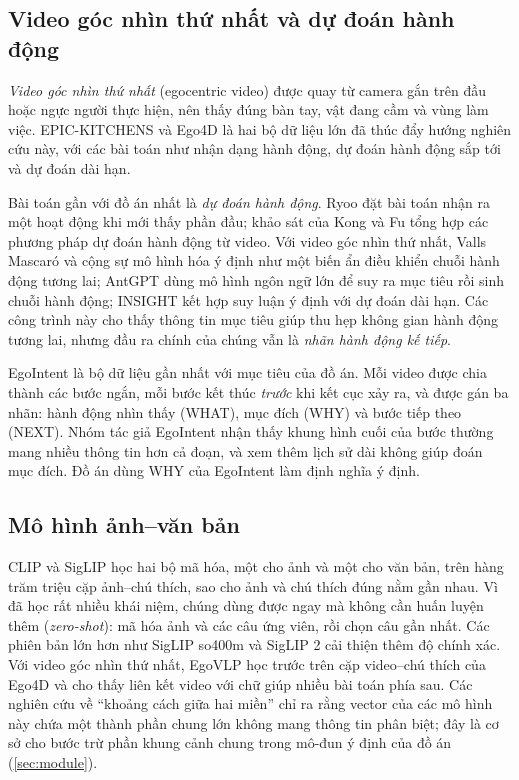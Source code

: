 \documentclass[a4paper,oneside]{report}
\begin{document}
\subsection{Video góc nhìn thứ nhất và dự đoán hành động}

\textit{Video góc nhìn thứ nhất} (egocentric video) được quay từ camera gắn trên đầu hoặc ngực người thực hiện, nên thấy đúng bàn tay, vật đang cầm và vùng làm việc. EPIC-KITCHENS \citep{damen2018epic} và Ego4D \citep{grauman2022ego4d} là hai bộ dữ liệu lớn đã thúc đẩy hướng nghiên cứu này, với các bài toán như nhận dạng hành động, dự đoán hành động sắp tới và dự đoán dài hạn.

Bài toán gần với đồ án nhất là \textit{dự đoán hành động}. Ryoo \citep{ryoo2011early} đặt bài toán nhận ra một hoạt động khi mới thấy phần đầu; khảo sát của Kong và Fu \citep{kong2022survey} tổng hợp các phương pháp dự đoán hành động từ video. Với video góc nhìn thứ nhất, Valls Mascaró và cộng sự \citep{mascaro2023intention} mô hình hóa ý định như một biến ẩn điều khiển chuỗi hành động tương lai; AntGPT \citep{zhao2024antgpt} dùng mô hình ngôn ngữ lớn để suy ra mục tiêu rồi sinh chuỗi hành động; INSIGHT \citep{chu2026insight} kết hợp suy luận ý định với dự đoán dài hạn. Các công trình này cho thấy thông tin mục tiêu giúp thu hẹp không gian hành động tương lai, nhưng đầu ra chính của chúng vẫn là \textit{nhãn hành động kế tiếp}.

EgoIntent \citep{egointent2026} là bộ dữ liệu gần nhất với mục tiêu của đồ án. Mỗi video được chia thành các bước ngắn, mỗi bước kết thúc \textit{trước} khi kết cục xảy ra, và được gán ba nhãn: hành động nhìn thấy (WHAT), mục đích (WHY) và bước tiếp theo (NEXT). Nhóm tác giả EgoIntent nhận thấy khung hình cuối của bước thường mang nhiều thông tin hơn cả đoạn, và xem thêm lịch sử dài không giúp đoán mục đích. Đồ án dùng WHY của EgoIntent làm định nghĩa ý định.

\subsection{Mô hình ảnh--văn bản}

CLIP \citep{radford2021clip} và SigLIP \citep{zhai2023siglip} học hai bộ mã hóa, một cho ảnh và một cho văn bản, trên hàng trăm triệu cặp ảnh--chú thích, sao cho ảnh và chú thích đúng nằm gần nhau. Vì đã học rất nhiều khái niệm, chúng dùng được ngay mà không cần huấn luyện thêm (\textit{zero-shot}): mã hóa ảnh và các câu ứng viên, rồi chọn câu gần nhất. Các phiên bản lớn hơn như SigLIP so400m \citep{alabdulmohsin2023getting} và SigLIP 2 \citep{tschannen2025siglip2} cải thiện thêm độ chính xác. Với video góc nhìn thứ nhất, EgoVLP \citep{lin2022egovlp} học trước trên cặp video--chú thích của Ego4D và cho thấy liên kết video với chữ giúp nhiều bài toán phía sau. Các nghiên cứu về ``khoảng cách giữa hai miền'' \citep{liang2022mindgap} chỉ ra rằng vector của các mô hình này chứa một thành phần chung lớn không mang thông tin phân biệt; đây là cơ sở cho bước trừ phần khung cảnh chung trong mô-đun ý định của đồ án (\cref{sec:module}).
\end{document}

